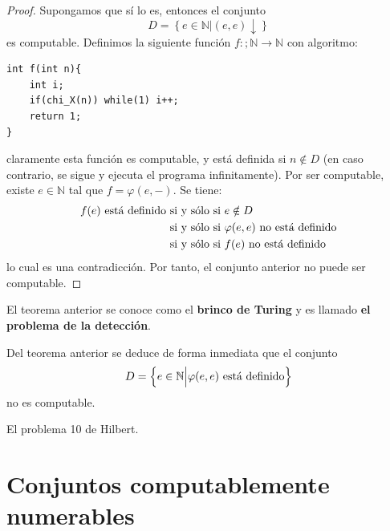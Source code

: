 \documentclass[12pt]{report}
\newcounter{it}
\theoremstyle{largebreak}
\newcommand\cf[3]{\ensuremath{#1:#2\rightarrow#3}}
\begin{document}
    \begin{proof}
        Supongamos que sí lo es, entonces el conjunto
        \begin{equation*}
            D=\left\{e\in\mathbb{N}\Big|(e,e)\downarrow \right\}
        \end{equation*}
        es computable. Definimos la siguiente función $\cf{f}{;\mathbb{N}}{\mathbb{N}}$ con algoritmo:
        \begin{lstlisting}
int f(int n){
    int i;
    if(chi_X(n)) while(1) i++;
    return 1;
}
        \end{lstlisting}
        claramente esta función es computable, y está definida si $n\notin D$ (en caso contrario, se sigue y ejecuta el programa infinitamente). Por ser computable, existe $e\in\mathbb{N}$ tal que $f=\varphi(e,-)$. Se tiene:
        \begin{equation*}
            \begin{split}
                f(e) \textup{ está definido}&\textup{ si y sólo si }e\notin D \\
                &\textup{ si y sólo si }\varphi(e,e)\textup{ no está definido} \\
                &\textup{ si y sólo si }f(e)\textup{ no está definido}\\
            \end{split}
        \end{equation*}
        lo cual es una contradicción. Por tanto, el conjunto anterior no puede ser computable.
    \end{proof}

    \begin{obs}
        El teorema anterior se conoce como el \textbf{brinco de Turing} y es llamado \textbf{el problema de la detección}.
    \end{obs}

    \begin{obs}
        Del teorema anterior se deduce de forma inmediata que el conjunto
        \begin{equation*}
            D=\left\{e\in\mathbb{N}\Big|\varphi(e,e)\textup{ está definido} \right\}
        \end{equation*}
        no es computable.
    \end{obs}

    \begin{exa}
        El problema 10 de Hilbert.
    \end{exa}

    \section{Conjuntos computablemente numerables}
\end{document}
